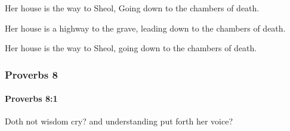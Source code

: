 			\begin{versebox}
					\item[BHS] 
					\item[ASV] Her house is the way to Sheol, Going down to the chambers of death.
					\item[NIV] Her house is a highway to the grave, leading down to the chambers of death.
					\item[NRSV] Her house is the way to Sheol, going down to the chambers of death.
			\end{versebox}
	\subsubsection{Proverbs 8} %
		\label{PROVERBS-8}

		\paragraph{Proverbs 8:1} %
			\label{PROVERBS-8-1}

			Doth not wisdom cry? and understanding put forth her voice?

